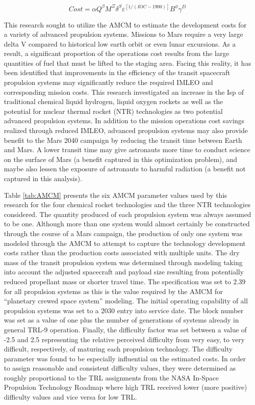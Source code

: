 \documentclass[]{aiaa-pretty}
\begin{document}
\[ Cost = \alpha Q^\beta M^\Xi \delta^S \varepsilon^{[1/(IOC-1900)]} B^\phi \gamma^D \]

This research sought to utilize the AMCM to estimate the development costs for a variety of advanced propulsion systems. Missions to Mars require a very large delta V compared to historical low earth orbit or even lunar excursions. As a result, a significant proportion of the operations cost results from the large quantities of fuel that must be lifted to the staging area. Facing this reality, it has been identified that improvements in the efficiency of the transit spacecraft propulsion systems may significantly reduce the required IMLEO and corresponding mission costs. This research investigated an increase in the Isp of traditional chemical liquid hydrogen, liquid oxygen rockets as well as the potential for nuclear thermal rocket (NTR) technologies as two potential advanced propulsion systems. In addition to the mission operations cost savings realized through reduced IMLEO, advanced propulsion systems may also provide benefit to the Mars 2040 campaign by reducing the transit time between Earth and Mars. A lower transit time may give astronauts more time to conduct science on the surface of Mars (a benefit captured in this optimization problem), and maybe also lessen the exposure of astronauts to harmful radiation (a benefit not captured in this analysis).

Table  \ref{tab:AMCM} presents the six AMCM parameter values used by this research for the four chemical rocket technologies and the three NTR technologies considered. The quantity produced of each propulsion system was always assumed to be one. Although more than one system would almost certainly be constructed through the course of a Mars campaign, the production of only one system was modeled through the AMCM to attempt to capture the technology development costs rather than the production costs associated with multiple units. The dry mass of the transit propulsion system was determined through modeling taking into account the adjusted spacecraft and payload size resulting from potentially reduced propellant mass or shorter travel time. The specification was set to 2.39 for all propulsion systems as this is the value required by the AMCM for “planetary crewed space system” modeling. The initial operating capability of all propulsion systems was set to a 2030 entry into service date. The block number was set as a value of one plus the number of generations of systems already in general TRL-9 operation. Finally, the difficulty factor was set between a value of -2.5 and 2.5 representing the relative perceived difficulty from very easy, to very difficult, respectively, of maturing each propulsion technology. The difficulty parameter was found to be especially influential on the estimated costs. In order to assign reasonable and consistent difficulty values, they were determined as roughly proportional to the TRL assignments from the NASA In-Space Propulsion Technology Roadmap where high TRL received lower (more positive) difficulty values and vice versa for low TRL. \cite{nasa2015techroadmap}
\end{document}
